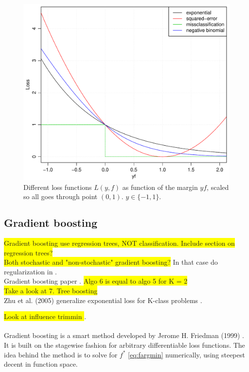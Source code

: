 \begin{figure}[h!]
\begin{center}
    \includegraphics[scale=0.5]{./figures/lossFunctions.pdf}
\end{center}
\caption{Different loss functions $L(y, f)$ as function of the margin $yf$, scaled so all goes through point $(0, 1)$. $y \in \{-1, 1\}$.}
\label{fig:lossFunctions}
\end{figure}
%
\subsection{Gradient boosting}
\label{sub:Gradient boosting}
\colorbox{yellow}{Gradient boosting use regression trees, NOT classification. Include section on regression trees?} \\
\colorbox{yellow}{Both stochastic and "non-stochastic" gradient boosting?} In that case do regularization in \cite{modstat}.
\\ Gradient boosting paper \cite{friedman}. \colorbox{yellow}{Algo 6 is equal to algo 5  for K = 2}\\
\colorbox{yellow}{Take a look at 7. Tree boosting \cite[p.~22]{friedman}} \\
Zhu et al. (2005) generalize exponential loss for K-class problems \cite[p.~349]{modstat}.

\colorbox{yellow}{Look at influence trimmin \cite{friedman}}.
\\
\\Gradient boosting is a smart method developed by Jerome H. Friedman (1999) \cite{friedman}. It is built on the stagewise fashion for arbitrary differentiable loss functions. The idea behind the method is to solve for $f^*$ \eqref{eq:fargmin} numerically, using steepest decent in function space.

